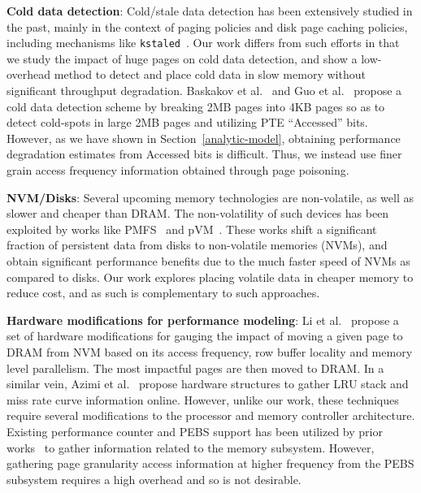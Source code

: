 \textbf{Cold data detection}: Cold/stale data detection has been extensively
studied in the past, mainly in the context of paging policies and disk page
caching policies, including mechanisms like {\tt kstaled}~\cite{kstaled,
vmware-mm, Zhou:2004:DTP:1024393.1024415}. 
Our work differs from such efforts in that
we study the impact of huge pages on cold data detection, and show a
low-overhead method to detect and place cold data in slow memory without significant
throughput degradation. Baskakov et al.~\cite{baskakov_identification_2016} and
Guo et al.~\cite{ref:Guo:2015:PBL:2731186.2731187} propose a cold data detection
scheme by breaking 2MB pages into 4KB pages so as to detect cold-spots in large
2MB pages and utilizing PTE ``Accessed'' bits. However, as we have shown in
Section~\ref{analytic-model}, obtaining performance degradation estimates from
Accessed bits is difficult. Thus, we instead use finer grain access frequency
information obtained through page poisoning.

\textbf{NVM/Disks}: Several upcoming memory technologies are non-volatile, as well
as slower and cheaper than DRAM. The non-volatility of such devices has been exploited 
by works like PMFS~\cite{ref:Dulloor:PMFS} and pVM~\cite{ref:Kannan:pVM}. These works shift a
significant fraction of persistent data from disks to non-volatile memories (NVMs), and obtain significant
performance benefits due to the much faster speed of NVMs as compared to disks.
Our work explores placing volatile data in cheaper memory to reduce cost, and as such is
complementary to such approaches.

\textbf{Hardware modifications for performance modeling}: Li et
al.~\cite{li2015managing} propose a set of hardware modifications for gauging
the impact of moving a given page to DRAM from NVM based on its access
frequency, row buffer locality and memory level parallelism. The most impactful
pages are then moved to DRAM. In a
similar vein, Azimi
et al.~\cite{azimi2007path} propose hardware structures to gather LRU stack and miss rate
curve information online. However, unlike our work, these techniques require
several modifications to the processor and memory controller architecture. 
Existing performance counter and PEBS support has been utilized by 
prior works~\cite{walsh2009generating,Eranian:2008:PCM:1353522.1353531} to
gather information related to the memory subsystem. However, gathering page
granularity access information at higher frequency from the PEBS subsystem
requires a high overhead and so is not desirable.

